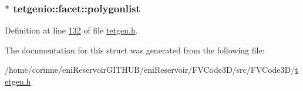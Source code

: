 \subsubsection[{\texorpdfstring{polygonlist}{polygonlist}}]{$\ast$ tetgenio\+::facet\+::polygonlist}\hypertarget{structtetgenio_1_1facet_ad73474fc4f07efdd714f0441948c5dfa}{}\label{structtetgenio_1_1facet_ad73474fc4f07efdd714f0441948c5dfa}


Definition at line \hyperlink{tetgen_8h_source_l00132}{132} of file \hyperlink{tetgen_8h_source}{tetgen.\+h}.



The documentation for this struct was generated from the following file\+:\begin{DoxyCompactItemize}
\item 
/home/corinne/eni\+Reservoir\+G\+I\+T\+H\+U\+B/eni\+Reservoir/\+F\+V\+Code3\+D/src/\+F\+V\+Code3\+D/\hyperlink{tetgen_8h}{tetgen.\+h}\end{DoxyCompactItemize}
